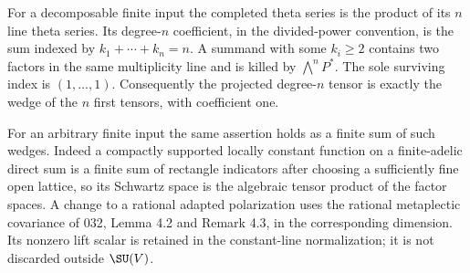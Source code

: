 For a decomposable finite input the completed theta series is the
product of its $n$ line theta series. Its degree-$n$ coefficient,
in the divided-power convention, is the sum indexed by
$k_1+\cdots+k_n=n$. A summand with some $k_i\geq2$ contains
two factors in the same multiplicity line and is killed by
$\bigwedge^nP^*$. The sole surviving index is $(1,\ldots,1)$.
Consequently the projected degree-$n$ tensor is exactly the wedge
of the $n$ first tensors, with coefficient one.

For an arbitrary finite input the same assertion holds as a finite
sum of such wedges. Indeed a compactly supported locally constant
function on a finite-adelic direct sum is a finite sum of rectangle
indicators after choosing a sufficiently fine open lattice, so its
Schwartz space is the algebraic tensor product of the factor spaces.
A change to a rational adapted polarization uses the rational
metaplectic covariance of 032, Lemma 4.2 and Remark 4.3, in the
corresponding dimension. Its nonzero lift scalar is retained in the
constant-line normalization; it is not discarded outside $\SU(V)$.

